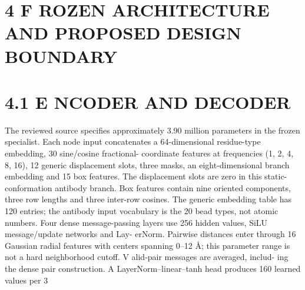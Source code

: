 \documentclass[11pt]{article}
\begin{document}
\section*{4 F ROZEN ARCHITECTURE AND PROPOSED DESIGN BOUNDARY}


\section*{4.1 E NCODER AND DECODER}

The reviewed source specifies approximately 3.90 million parameters in the frozen specialist.
Each node input concatenates a 64-dimensional residue-type embedding, 30 sine/cosine fractional-
coordinate features at frequencies (1, 2, 4, 8, 16), 12 generic displacement slots, three masks, an
eight-dimensional branch embedding and 15 box features. The displacement slots are zero in this
static-conformation antibody branch. Box features contain nine oriented components, three row
lengths and three inter-row cosines. The generic embedding table has 120 entries; the antibody
input vocabulary is the 20 bead types, not atomic numbers.
Four dense message-passing layers use 256 hidden values, SiLU message/update networks and Lay-
erNorm. Pairwise distances enter through 16 Gaussian radial features with centers spanning 0–12 Å;
this parameter range is not a hard neighborhood cutoff. V alid-pair messages are averaged, includ-
ing the dense pair construction. A LayerNorm–linear–tanh head produces 160 learned values per
3
\end{document}
